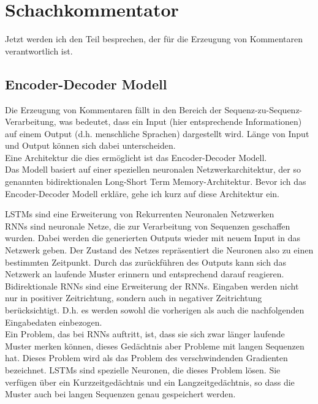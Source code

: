 \section{Schachkommentator}

Jetzt werden ich den Teil besprechen, der für die Erzeugung von Kommentaren verantwortlich ist.

\subsection{Encoder-Decoder Modell}

Die Erzeugung von Kommentaren fällt in den Bereich der Sequenz-zu-Sequenz-Verarbeitung, was bedeutet, dass ein Input (hier entsprechende Informationen) auf einem Output (d.h. menschliche Sprachen) dargestellt wird. Länge von Input und Output können sich dabei unterscheiden.\\

Eine Architektur die dies ermöglicht ist das Encoder-Decoder Modell.\\

Das Modell basiert auf einer speziellen neuronalen Netzwerkarchitektur, der so genannten bidirektionalen Long-Short Term Memory-Architektur. Bevor ich das Encoder-Decoder Modell erkläre, gehe ich kurz auf diese Architektur ein.

\newpage

LSTMs sind eine Erweiterung von Rekurrenten Neuronalen Netzwerken\\

RNNs sind neuronale Netze, die zur Verarbeitung von Sequenzen geschaffen wurden. Dabei werden die generierten Outputs wieder mit neuem Input in das Netzwerk geben. Der Zustand des Netzes repräsentiert die Neuronen also zu einen bestimmten Zeitpunkt. Durch das zurückführen des Outputs kann sich das Netzwerk an laufende Muster erinnern und entsprechend darauf reagieren.\\

Bidirektionale RNNs sind eine Erweiterung der RNNs. Eingaben werden nicht nur in positiver Zeitrichtung, sondern auch in negativer Zeitrichtung berücksichtigt. D.h. es werden sowohl die vorherigen als auch die nachfolgenden Eingabedaten einbezogen.\\

Ein Problem, das bei RNNs auftritt, ist, dass sie sich zwar länger laufende Muster merken können, dieses Gedächtnis aber Probleme mit langen Sequenzen hat. Dieses Problem wird als das Problem des verschwindenden Gradienten bezeichnet. LSTMs sind spezielle Neuronen, die dieses Problem lösen. Sie verfügen über ein Kurzzeitgedächtnis und ein Langzeitgedächtnis, so dass die Muster auch bei langen Sequenzen genau gespeichert werden.\\

